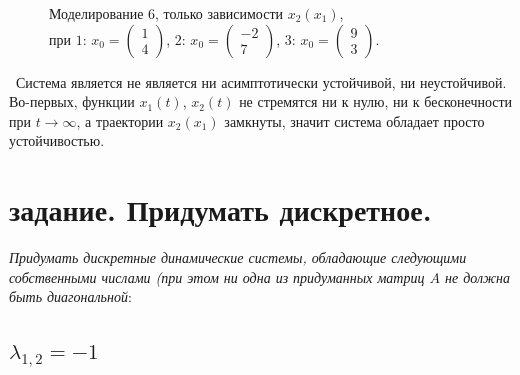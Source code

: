 \documentclass[a5paper, 10pt]{article}
\theoremstyle{definition}
\theoremstyle{plain}
\theoremstyle{remark}
\begin{document}
\begin{figure}[h!]
\caption{Моделирование 6, только зависимости $x_2(x_1)$, \\при  $1: \, x_0 = \begin{pmatrix} 1 \\ 4 \end{pmatrix}$, $2: \, x_0 = \begin{pmatrix} -2 \\ 7 \end{pmatrix}$, $3: \, x_0 = \begin{pmatrix} 9 \\ 3 \end{pmatrix}$.}
\end{figure}

\newpage
\,
\newpage
Система является не является ни асимптотически устойчивой, ни неустойчивой. Во-первых, функции $x_1(t)$, $x_2(t)$ не стремятся ни к нулю, ни к бесконечности при $t \to \infty$, а траектории $x_2(x_1)$ замкнуты, значит система обладает просто устойчивостью.



\newpage
\section{задание. Придумать дискретное.}
\textit{Придумать дискретные динамические системы, обладающие следующими собственными числами (при этом ни одна из придуманных матриц $A$ не должна быть диагональной}:

\subsection{$\lambda_{1, 2} = -1$}
\end{document}
